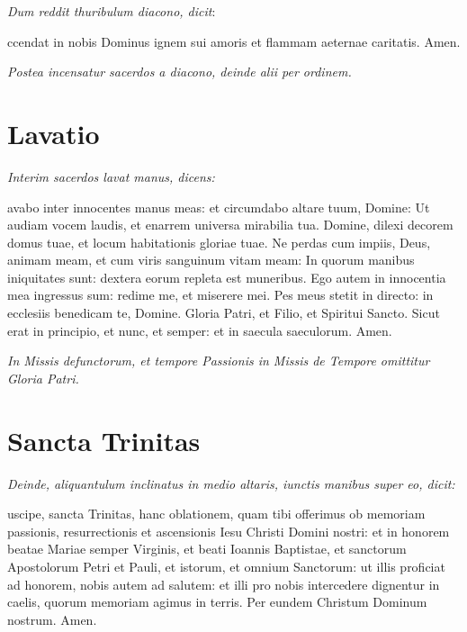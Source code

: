 \textit{Dum reddit thuribulum diacono, dicit}:

ccendat in nobis Dominus ignem sui amoris et flammam aeternae
caritatis.  Amen.

\textit{Postea incensatur sacerdos a diacono, deinde alii per ordinem.}


\section{Lavatio}

\textit{Interim sacerdos lavat manus, dicens:}


avabo inter innocentes manus meas: et circumdabo altare tuum,
Domine: Ut audiam vocem laudis, et enarrem universa mirabilia tua.  Domine,
dilexi decorem domus tuae, et locum habitationis gloriae tuae.  Ne perdas cum
impiis, Deus, animam meam, et cum viris sanguinum vitam meam: In quorum manibus
iniquitates sunt: dextera eorum repleta est muneribus.  Ego autem in innocentia
mea ingressus sum: redime me, et miserere mei.  Pes meus stetit in directo: in
ecclesiis benedicam te, Domine.  Gloria Patri, et Filio, et Spiritui Sancto.
Sicut erat in principio, et nunc, et semper: et in saecula saeculorum.  Amen.

\divisio

\textit{%
    In Missis defunctorum, et tempore Passionis in Missis de Tempore omittitur
    Gloria Patri.
}

\divisio

\vspace{-0.5\baselineskip}

\section{Sancta Trinitas}

\textit{%
    Deinde, aliquantulum inclinatus in medio altaris, iunctis manibus super eo,
    dicit:
}

uscipe, sancta Trinitas, hanc oblationem, quam tibi offerimus ob
memoriam passionis, resurrectionis et ascensionis Iesu Christi Domini nostri: et
in honorem beatae Mariae semper Virginis, et beati Ioannis Baptistae, et
sanctorum Apostolorum Petri et Pauli, et istorum, et omnium Sanctorum: ut illis
proficiat ad honorem, nobis autem ad salutem: et illi pro nobis intercedere
dignentur in caelis, quorum memoriam agimus in terris.  Per eundem Christum
Dominum nostrum.  Amen.

